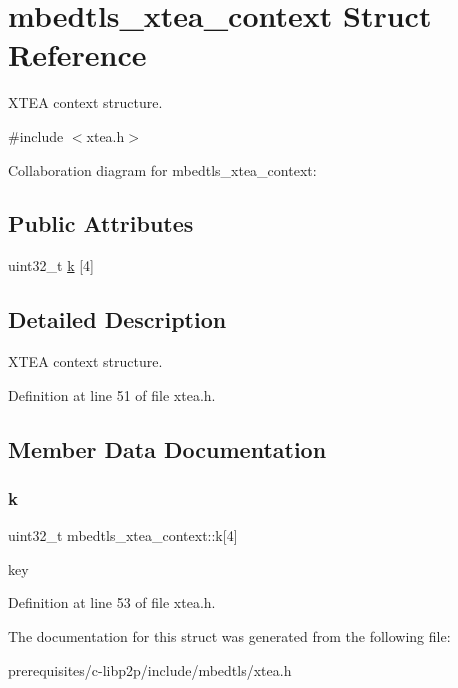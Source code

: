 \hypertarget{structmbedtls__xtea__context}{}\section{mbedtls\+\_\+xtea\+\_\+context Struct Reference}
\label{structmbedtls__xtea__context}


X\+T\+EA context structure.  




{\ttfamily \#include $<$xtea.\+h$>$}



Collaboration diagram for mbedtls\+\_\+xtea\+\_\+context\+:
\subsection*{Public Attributes}
\begin{DoxyCompactItemize}
\item 
uint32\+\_\+t \mbox{\hyperlink{structmbedtls__xtea__context_a3deb125da7fe64c36a22030bf19af98f}{k}} \mbox{[}4\mbox{]}
\end{DoxyCompactItemize}


\subsection{Detailed Description}
X\+T\+EA context structure. 

Definition at line 51 of file xtea.\+h.



\subsection{Member Data Documentation}
\mbox{\label{structmbedtls__xtea__context_a3deb125da7fe64c36a22030bf19af98f}} 
\subsubsection{\texorpdfstring{k}{k}}
{\footnotesize\ttfamily uint32\+\_\+t mbedtls\+\_\+xtea\+\_\+context\+::k\mbox{[}4\mbox{]}}

key 

Definition at line 53 of file xtea.\+h.



The documentation for this struct was generated from the following file\+:\begin{DoxyCompactItemize}
\item 
prerequisites/c-\/libp2p/include/mbedtls/xtea.\+h\end{DoxyCompactItemize}
